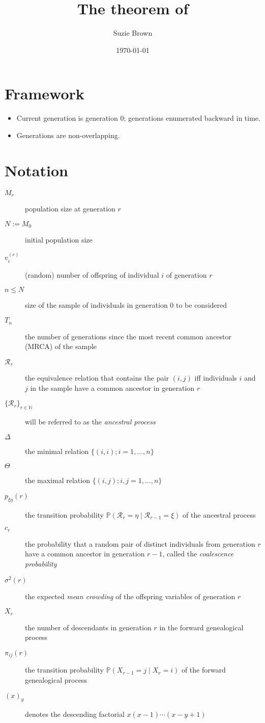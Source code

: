 \documentclass{article}
\title{The theorem of \citet{mohle1998}}
\author{Suzie Brown}
\date{\today}
\newcommand{\PR}{\mathbb{P}}
\begin{document}
\maketitle

\section*{Framework}
\begin{itemize}
\item Current generation is generation $0$; generations enumerated backward in time.
\item Generations are non-overlapping.
\end{itemize}

\section*{Notation}
\begin{description}
\item[$M_r$] population size at generation $r$
\item[$N := M_0$] initial population size
\item[$v_i^{(r)}$] (random) number of offspring of individual $i$ of generation $r$
\item[$n\leq N$] size of the sample of individuals in generation 0 to be considered
\item[$T_n$] the number of generations since the most recent common ancestor (MRCA) of the sample
\item[$\mathcal{R}_r$] the equivalence relation that contains the pair $(i,j)$ iff individuals $i$ and $j$ in the sample have a common ancestor in generation $r$
\item[$\{\mathcal{R}_r\}_{r\in\mathbb{N}}$] will be referred to as the \emph{ancestral process}
\item[$\Delta$] the minimal relation $\{(i,i); i=1,\dots,n\}$
\item[$\Theta$] the maximal relation $\{(i,j); i,j = 1,\dots,n\}$
\item[$p_{\xi\eta}(r)$] the transition probability $\PR(\mathcal{R}_r=\eta\mid\mathcal{R}_{r-1}=\xi)$ of the ancestral process
\item[$c_r$] the probability that a random pair of distinct individuals from generation $r$ have a common ancestor in generation $r-1$, called the \emph{coalescence probability}
\item[$\sigma^2(r)$] the expected \emph{mean crowding} of the offspring variables of generation $r$
\item[$X_r$] the number of descendants in generation $r$ in the forward genealogical process
\item[$\pi_{ij}(r)$] the transition probability $\PR(X_{r-1}=j\mid X_r=i)$ of the forward genealogical process
\item[$(x)_y$] denotes the descending factorial $x(x-1)\cdots(x-y+1)$
\end{description}
\end{document}
